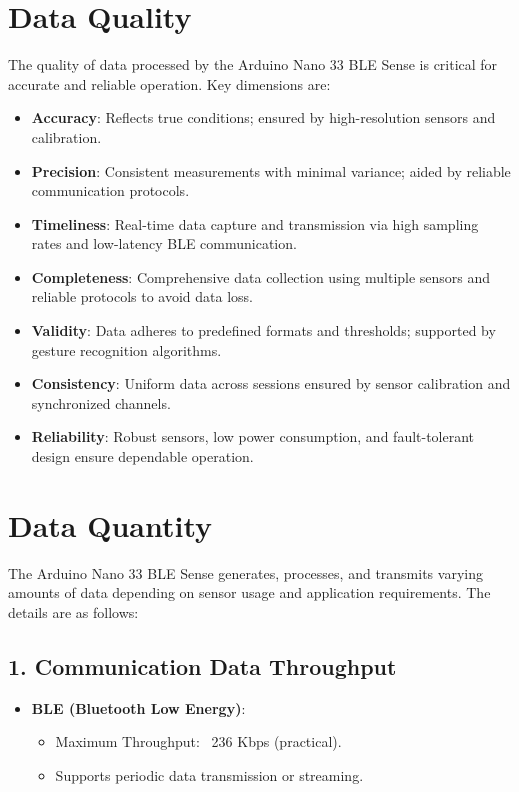 \section{Data Quality}
	The quality of data processed by the Arduino Nano 33 BLE Sense is critical for accurate and reliable operation. Key dimensions are:
	
	\begin{itemize}
		\item \textbf{Accuracy}: Reflects true conditions; ensured by high-resolution sensors and calibration.
		\item \textbf{Precision}: Consistent measurements with minimal variance; aided by reliable communication protocols.
		\item \textbf{Timeliness}: Real-time data capture and transmission via high sampling rates and low-latency BLE communication.
		\item \textbf{Completeness}: Comprehensive data collection using multiple sensors and reliable protocols to avoid data loss.
		\item \textbf{Validity}: Data adheres to predefined formats and thresholds; supported by gesture recognition algorithms.
		\item \textbf{Consistency}: Uniform data across sessions ensured by sensor calibration and synchronized channels.
		\item \textbf{Reliability}: Robust sensors, low power consumption, and fault-tolerant design ensure dependable operation.
	\end{itemize}

\section{Data Quantity}
	The Arduino Nano 33 BLE Sense generates, processes, and transmits varying amounts of data depending on sensor usage and application requirements. The details are as follows:

	\subsection*{1. Communication Data Throughput}
	\begin{itemize}
		\item \textbf{BLE (Bluetooth Low Energy)}:
		\begin{itemize}
			\item Maximum Throughput: ~236 Kbps (practical).
			\item Supports periodic data transmission or streaming.
		\end{itemize}
	\end{itemize}
	
